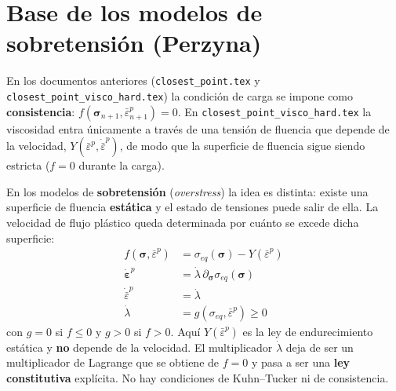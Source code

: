 \documentclass[12pt]{article}
\begin{document}
\section*{Base de los modelos de sobretensi\'on (Perzyna)}

En los documentos anteriores (\texttt{closest\_point.tex} y \texttt{closest\_point\_visco\_hard.tex}) la condici\'on de carga se impone como \textbf{consistencia}: $f\left(\pmb{\sigma}_{n+1}, \bar\varepsilon^p_{n+1}\right) = 0$. En \texttt{closest\_point\_visco\_hard.tex} la viscosidad entra \'unicamente a trav\'es de una tensi\'on de fluencia que depende de la velocidad, $Y\left(\bar\varepsilon^p, \dot{\bar\varepsilon}^p\right)$, de modo que la superficie de fluencia sigue siendo estricta ($f=0$ durante la carga).

En los modelos de \textbf{sobretensi\'on} (\textit{overstress}) la idea es distinta: existe una superficie de fluencia \textbf{est\'atica} y el estado de tensiones puede salir de ella. La velocidad de flujo plástico queda determinada por cu\'anto se excede dicha superficie:
\begin{align}
    f\left(\pmb{\sigma}, \bar\varepsilon^p\right) &= \sigma_{eq}\left(\pmb{\sigma}\right) - Y\left(\bar\varepsilon^p\right) \\
    \pmb{\dot\varepsilon}^p &= \dot\lambda\, \partial_{\pmb{\sigma}}\sigma_{eq}\left(\pmb{\sigma}\right) \\
    \dot{\bar\varepsilon}^p &= \dot\lambda \\
    \dot\lambda &= g\left(\sigma_{eq}, \bar\varepsilon^p\right) \geq 0 \label{eqn:flow_general}
\end{align}
con $g = 0$ si $f \leq 0$ y $g > 0$ si $f > 0$. Aqu\'i $Y\left(\bar\varepsilon^p\right)$ es la ley de endurecimiento est\'atica y \textbf{no} depende de la velocidad. El multiplicador $\dot\lambda$ deja de ser un multiplicador de Lagrange que se obtiene de $f=0$ y pasa a ser una \textbf{ley constitutiva} expl\'icita. No hay condiciones de Kuhn--Tucker ni de consistencia.
\end{document}
